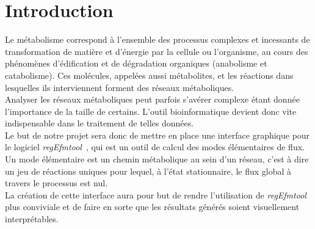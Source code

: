 \chapter*{Introduction}

Le métabolisme correspond à l'ensemble des processus complexes et incessants de transformation de matière et d'énergie par la cellule ou l'organisme, au cours des phénomènes d'édification et de dégradation organiques (anabolisme et catabolisme). 
Ces molécules, appelées aussi métabolites, et les réactions dans lesquelles ils interviennent forment des réseaux métaboliques. \\

Analyser les réseaux métaboliques peut parfois s'avérer complexe étant donnée l'importance de la taille de certains. L'outil bioinformatique devient donc vite indispensable dans le traitement de telles données.\\ 
Le but de notre projet sera donc de mettre en place une interface graphique pour le logiciel \emph{regEfmtool}~\cite{regefmtool1:url}, qui est un outil de calcul des modes élémentaires de flux.
Un mode élémentaire est un chemin métabolique au sein d'un réseau, c'est à dire un jeu de réactions uniques pour lequel, à l'état stationnaire, le flux global à travers le processus est nul.\\
La création de cette interface aura pour but de rendre l'utilisation de \emph{regEfmtool} plus conviviale et de faire en sorte que les résultats générés soient visuellement interprétables. 
